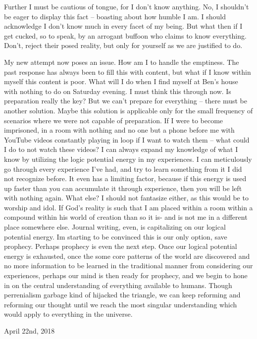 Further I must be cautious of tongue, for I don't know anything. No, I
shouldn't be eager to display this fact -- boasting about how humble I
am. I should acknowledge I don't know much in every facet of my being.
But what then if I get cucked, so to speak, by an arrogant buffoon who
claims to know everything. Don't, reject their posed reality, but only
for yourself as we are justified to do.

My new attempt now poses an issue. How am I to handle the emptiness. The
past response has always been to fill this with content, but what if I
know within myself this content is poor. What will I do when I find
myself at Ben's house with nothing to do on Saturday evening. I must
think this through now. Is preparation really the key? But we can't
prepare for everything -- there must be another solution. Maybe this
solution is applicable only for the small frequency of scenarios where
we were not capable of preparation. If I were to become imprisoned, in a
room with nothing and no one but a phone before me with YouTube videos
constantly playing in loop if I want to watch them -- what could I do to
not watch these videos? I can always expand my knowledge of what I know
by utilizing the logic potential energy in my experiences. I can
meticulously go through every experience I've had, and try to learn
something from it I did not recognize before. It even has a limiting
factor, because if this energy is used up faster than you can accumulate
it through experience, then you will be left with nothing again. What
else? I should not fantasize either, as this would be to worship and
idol. If God's reality is such that I am placed within a room within a
compound within his world of creation than so it is- and is not me in a
different place somewhere else. Journal writing, even, is capitalizing
on our logical potential energy. Im starting to be convinced this is our
only option, save prophecy. Perhaps prophecy is even the next step. Once
our logical potential energy is exhausted, once the some core patterns
of the world are discovered and no more information to be learned in the
traditional manner from considering our experiences, perhaps our mind is
then ready for prophecy, and we begin to hone in on the central
understanding of everything available to humans. Though perrenialism
garbage kind of hijacked the triangle, we can keep reforming and
reforming our thought until we reach the most singular understanding
which would apply to everything in the universe.

\bigskip
\bigskip
April 22nd, 2018

